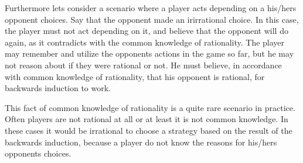 Furthermore lets consider a scenario where a player acts depending on a his/hers opponent choices. Say that the opponent made an irirrational choice. In this case, the player must not act depending on it, and believe that the opponent will do again, as it contradicts with the common knowledge of rationality.  The player may remember and utilize the opponents actions in the game so far, but he may not reason about if they were rational or not. He must believe, in accordance with common knowledge of rationality, that his opponent is rational, for backwards induction to work.

This fact of common knowledge of rationality is a quite rare scenario in practice. Often players are not rational at all or at least it is not common knowledge. In these cases it would be irrational to choose a strategy based on the result of the backwards induction, because a player do not know the reasons for his/hers opponents choices.



